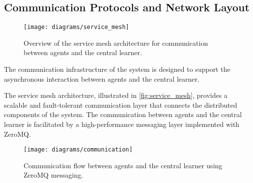 \documentclass[11pt]{article}
\begin{document}
    \subsection{Communication Protocols and Network Layout}
    \label{subsec:communication}

    \begin{figure}[htb]
        \centering
        \texttt{[image: diagrams/service\_mesh]}
        \caption{Overview of the service mesh architecture for communication between agents and the central learner.}
        \label{fig:service_mesh}
    \end{figure}

    The communication infrastructure of the system is designed to support the asynchronous interaction between agents and the central learner.

    The service mesh architecture, illustrated in \autoref{fig:service_mesh}, provides a scalable and fault-tolerant communication layer that connects the distributed components of the system.
    The communication between agents and the central learner is facilitated by a high-performance messaging layer implemented with ZeroMQ.

    \begin{figure}[htb]
        \centering
        \texttt{[image: diagrams/communication]}
        \caption{Communication flow between agents and the central learner using ZeroMQ messaging.}
        \label{fig:communication}
    \end{figure}
\end{document}
